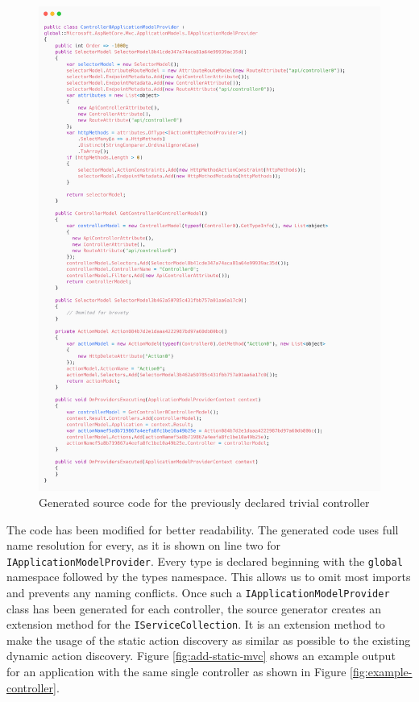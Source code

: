 
\begin{figure}[H]
\centering
\includegraphics[width=\linewidth]{graphics/example-application-model-provider.png}
\caption{Generated source code for the previously declared trivial controller}
\label{fig:example-application-model-provider}
\end{figure}

\restoregeometry  %

The code has been modified for better readability. The generated code uses full name resolution for every, as it is shown on line two for \texttt{IApplicationModelProvider}. Every type is declared beginning with the \texttt{global} namespace followed by the types namespace. This allows us to omit most imports and prevents any naming conflicts. Once such a \texttt{IApplicationModelProvider} class has been generated for each controller, the source generator creates an extension method for the \texttt{IServiceCollection}. It is an extension method to make the usage of the static action discovery as similar as possible to the existing dynamic action discovery. Figure \ref{fig:add-static-mvc} shows an example output for an application with the same single controller as shown in Figure \ref{fig:example-controller}.

